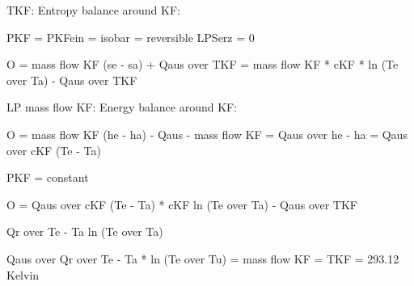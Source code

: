 TKF: Entropy balance around KF:

PKF = PKFein = isobar = reversible
LPSerz = 0

O = mass flow KF (se - sa) + Qaus over TKF = mass flow KF * cKF * ln (Te over Ta) - Qaus over TKF

LP mass flow KF: Energy balance around KF:

O = mass flow KF (he - ha) - Qaus
- mass flow KF = Qaus over he - ha = Qaus over cKF (Te - Ta) 

PKF = constant

O = Qaus over cKF (Te - Ta) * cKF ln (Te over Ta) - Qaus over TKF

Qr over Te - Ta ln (Te over Ta)

Qaus over Qr over Te - Ta * ln (Te over Tu) = mass flow KF = TKF = 293.12 Kelvin